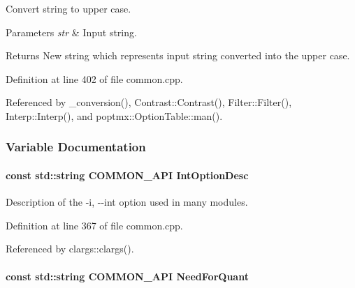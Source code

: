 Convert string to upper case. 


\begin{DoxyParams}{Parameters}
{\em str} & Input string.\\
\hline
\end{DoxyParams}
\begin{DoxyReturn}{Returns}
New string which represents input string converted into the upper case. 
\end{DoxyReturn}


Definition at line 402 of file common.cpp.



Referenced by \_\-conversion(), Contrast::Contrast(), Filter::Filter(), Interp::Interp(), and poptmx::OptionTable::man().



\subsubsection{Variable Documentation}
\hypertarget{group__CommonFunctions_ga74d5dcc9d3050f0a8230fc00606fa9a3}{
\paragraph[{IntOptionDesc}]{\setlength{\rightskip}{0pt plus 5cm}const std::string COMMON\_\-API {\bf IntOptionDesc}}\hfill}
\label{group__CommonFunctions_ga74d5dcc9d3050f0a8230fc00606fa9a3}


Description of the -\/i, -\/-\/int option used in many modules. 



Definition at line 367 of file common.cpp.



Referenced by clargs::clargs().

\hypertarget{group__CommonFunctions_ga5e3460d8e3eb92dd0ed0e19b21e183ce}{
\paragraph[{NeedForQuant}]{\setlength{\rightskip}{0pt plus 5cm}const std::string COMMON\_\-API {\bf NeedForQuant}}\hfill}
\label{group__CommonFunctions_ga5e3460d8e3eb92dd0ed0e19b21e183ce}


